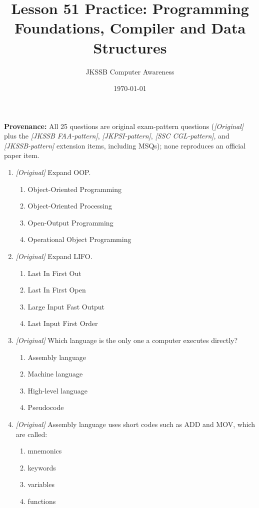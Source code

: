 \documentclass[11pt]{article}
\title{Lesson 51 Practice: Programming Foundations, Compiler and Data Structures}
\author{JKSSB Computer Awareness}
\date{\today}
\begin{document}
\maketitle
\noindent\textbf{Provenance:} All 25 questions are original exam-pattern questions (\textit{[Original]} plus the \textit{[JKSSB FAA-pattern]}, \textit{[JKPSI-pattern]}, \textit{[SSC CGL-pattern]}, and \textit{[JKSSB-pattern]} extension items, including MSQs); none reproduces an official paper item.

\begin{enumerate}[label=\textbf{Q\arabic*.}, leftmargin=*]
\item \textit{[Original]} Expand OOP.
  \begin{enumerate}[label=\Alph*.]
    \item Object-Oriented Programming
    \item Object-Oriented Processing
    \item Open-Output Programming
    \item Operational Object Programming
  \end{enumerate}
\item \textit{[Original]} Expand LIFO.
  \begin{enumerate}[label=\Alph*.]
    \item Last In First Out
    \item Last In First Open
    \item Large Input Fast Output
    \item Last Input First Order
  \end{enumerate}
\item \textit{[Original]} Which language is the only one a computer executes
  directly?
  \begin{enumerate}[label=\Alph*.]
    \item Assembly language
    \item Machine language
    \item High-level language
    \item Pseudocode
  \end{enumerate}
\item \textit{[Original]} Assembly language uses short codes such as ADD and
  MOV, which are called:
  \begin{enumerate}[label=\Alph*.]
    \item mnemonics
    \item keywords
    \item variables
    \item functions

\end{enumerate}
\end{enumerate}
\end{document}
